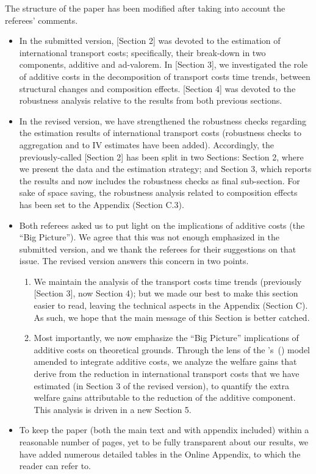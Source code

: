 \documentclass[a4paper,11pt]{article}
\newcommand\cites[1]{\citeauthor{#1}'s\ (\citeyear{#1})}
\begin{document}
The structure of the paper has been modified after taking into account the referees' comments.
\begin{itemize}
\item In the submitted version, [Section 2] was devoted to the estimation of international transport costs; specifically, their break-down in two components, additive and ad-valorem. In [Section 3], we investigated the role of additive costs in the decomposition of transport costs time trends, between structural changes and composition effects. [Section 4] was devoted to the robustness analysis relative to the results from both previous sections.
\item In the revised version, we have strengthened the robustness checks regarding the estimation results of international transport costs (robustness checks to aggregation and to IV estimates have been added). Accordingly, the previously-called [Section 2] has been split in two Sections: Section 2, where we present the data and the estimation strategy; and Section 3, which reports the results and now includes the robustness checks as final sub-section. For sake of space saving, the robustness analysis related to composition effects has been set to the Appendix (Section C.3).
\item Both referees asked us to put light on the implications of additive costs (the ``Big Picture''). We agree that this was not enough emphasized in the submitted version, and we thank the referees for their suggestions on that issue. The revised version answers this concern in two points.
    \begin{enumerate}
    \item We maintain the analysis of the transport costs time trends (previously [Section 3], now Section 4); but we made our best to make this section easier to read, leaving the technical aspects in the Appendix (Section C). As such, we hope that the main message of this Section is better catched.
    \item Most importantly, we now emphasize the ``Big Picture'' implications of additive costs on theoretical grounds. Through the lens of the \cites{melitz} model amended to integrate additive costs, we analyze the welfare gains that derive from the reduction in international transport costs that we have estimated (in Section 3 of the revised version), to quantify the extra welfare gains attributable to the reduction of the additive component. This analysis is driven in a new Section 5.
        \end{enumerate}
\item To keep the paper (both the main text and with appendix included) within a reasonable number of pages, yet to be fully transparent about our results, we have added numerous detailed tables in the Online Appendix, to which the reader can refer to.
\end{itemize}
\end{document}
